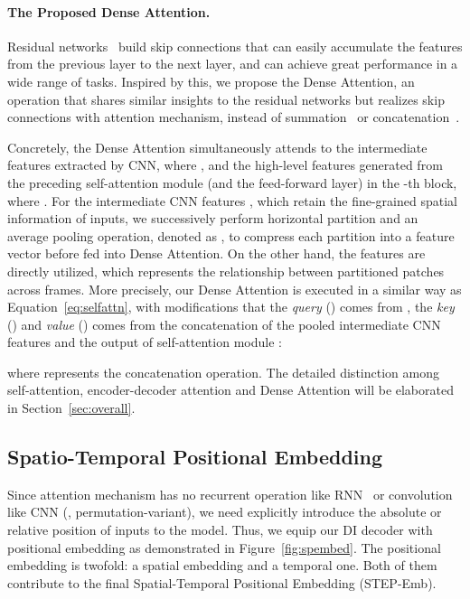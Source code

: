 \documentclass[10pt,twocolumn,letterpaper]{article}
\begin{document}
\vspace{-2mm}
\paragraph{The Proposed Dense Attention.}
Residual networks~\cite{he2016deep,huang2017densely} build skip connections that can easily accumulate the features from the previous layer to the next layer, and can achieve great performance in a wide range of tasks. Inspired by this, we propose the Dense Attention, an operation that shares similar insights to the residual networks but realizes skip connections with attention mechanism, instead of summation~\cite{he2016deep} or concatenation~\cite{huang2017densely}.

Concretely, the Dense Attention simultaneously attends to the intermediate features  extracted by CNN, where , and the high-level features  generated from the preceding self-attention module (and the feed-forward layer) in the -th block, where . For the intermediate CNN features , which retain the fine-grained spatial information of inputs, we successively perform horizontal partition and an average pooling operation, denoted as , to compress each partition into a feature vector before fed into Dense Attention. On the other hand, the features  are directly utilized, which represents the relationship between partitioned patches across frames. More precisely, our Dense Attention  is executed in a similar way as Equation~\eqref{eq:selfattn}, with modifications that the \textit{query} () comes from , the \textit{key} () and \textit{value} () comes from the concatenation of the pooled intermediate CNN features  and the output of self-attention module :

where  represents the concatenation operation. The detailed distinction among self-attention, encoder-decoder attention and Dense Attention will be elaborated in Section~\ref{sec:overall}.

\subsection{Spatio-Temporal Positional Embedding}
Since attention mechanism has no recurrent operation like RNN~\cite{hochreiter1997long} or convolution like CNN (\ie, permutation-variant), we need explicitly introduce the absolute or relative position of inputs to the model. Thus, we equip our DI decoder with positional embedding as demonstrated in Figure~\ref{fig:spembed}. The positional embedding is twofold: a spatial embedding and a temporal one. Both of them contribute to the final Spatial-Temporal Positional Embedding (STEP-Emb).
\end{document}

